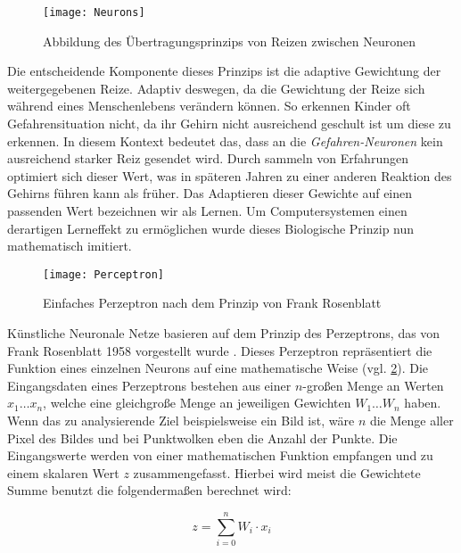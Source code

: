 \begin{figure}%
	\centering
    \texttt{[image: Neurons]}
    \caption{Abbildung des Übertragungsprinzips von Reizen zwischen Neuronen \cite{bib:Neurons}}
    \label{fig:MLCS}
\end{figure}

Die entscheidende Komponente dieses Prinzips ist die adaptive Gewichtung der weitergegebenen Reize. Adaptiv deswegen, da die Gewichtung der Reize sich während eines Menschenlebens verändern können. So erkennen Kinder oft Gefahrensituation nicht, da ihr Gehirn nicht ausreichend geschult ist um diese zu erkennen. In diesem Kontext bedeutet das, dass an die \textit{Gefahren-Neuronen} kein ausreichend starker Reiz gesendet wird. Durch sammeln von Erfahrungen optimiert sich dieser Wert, was in späteren Jahren zu einer anderen Reaktion des Gehirns führen kann als früher. Das Adaptieren dieser Gewichte auf einen passenden Wert bezeichnen wir als Lernen. Um Computersystemen einen derartigen Lerneffekt zu ermöglichen wurde dieses Biologische Prinzip nun mathematisch imitiert. \\

\begin{figure}%
	\centering
    \texttt{[image: Perceptron]}
    \caption{Einfaches Perzeptron nach dem Prinzip von Frank Rosenblatt}
    \label{fig:Perceptron}
\end{figure}

Künstliche Neuronale Netze basieren auf dem Prinzip des Perzeptrons, das von Frank Rosenblatt 1958 vorgestellt wurde \cite{bib:Perzeptron}. Dieses Perzeptron repräsentiert die Funktion eines einzelnen Neurons auf eine mathematische Weise (vgl. \ref{fig:Perceptron}). Die Eingangsdaten eines Perzeptrons bestehen aus einer \(n\)-großen Menge an Werten \(x_1 \dots x_n\), welche eine gleichgroße Menge an jeweiligen Gewichten \(W_1 \dots W_n\) haben. Wenn das zu analysierende Ziel beispielsweise ein Bild ist, wäre \(n\) die Menge aller Pixel des Bildes und bei Punktwolken eben die Anzahl der Punkte. Die Eingangswerte werden von einer mathematischen Funktion empfangen und zu einem skalaren Wert \(z\) zusammengefasst. Hierbei wird meist die Gewichtete Summe benutzt die folgendermaßen berechnet wird:

\begin{equation}
z = \sum \limits_{i=0}^{n} W_i \cdot x_i
\end{equation}\\

